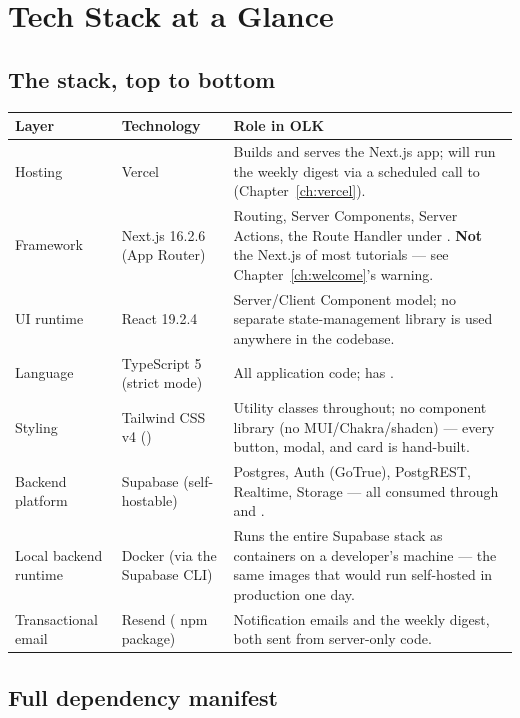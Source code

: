 \chapter{Tech Stack at a Glance}
\label{ch:techstack}

\section{The stack, top to bottom}

\begin{center}
\begin{tabularx}{\textwidth}{@{}l l Y@{}}
\toprule
\textbf{Layer} & \textbf{Technology} & \textbf{Role in OLK} \\
\midrule
Hosting & Vercel & Builds and serves the Next.js app; will run the weekly digest via a scheduled call to  (Chapter~\ref{ch:vercel}). \\
Framework & Next.js 16.2.6 (App Router) & Routing, Server Components, Server Actions, the Route Handler under . \textbf{Not} the Next.js of most tutorials — see Chapter~\ref{ch:welcome}'s warning. \\
UI runtime & React 19.2.4 & Server/Client Component model; no separate state-management library is used anywhere in the codebase. \\
Language & TypeScript 5 (strict mode) & All application code;  has . \\
Styling & Tailwind CSS v4 () & Utility classes throughout; no component library (no MUI/Chakra/shadcn) — every button, modal, and card is hand-built. \\
Backend platform & Supabase (self-hostable) & Postgres, Auth (GoTrue), PostgREST, Realtime, Storage — all consumed through  and . \\
Local backend runtime & Docker (via the Supabase CLI) & Runs the entire Supabase stack as containers on a developer's machine — the same images that would run self-hosted in production one day. \\
Transactional email & Resend ( npm package) & Notification emails and the weekly digest, both sent from server-only code. \\
\bottomrule
\end{tabularx}
\end{center}

\section{Full dependency manifest}

